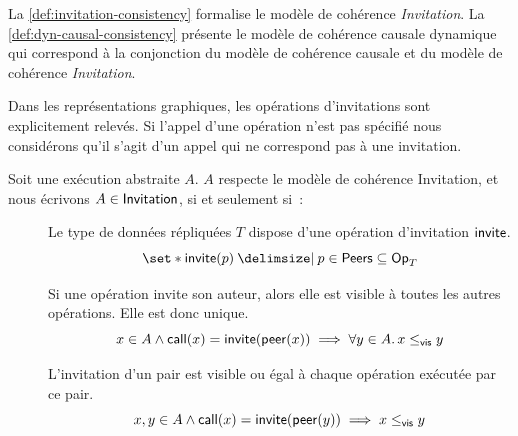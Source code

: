 La \autoref{def:invitation-consistency} formalise le modèle de cohérence \emph{Invitation}. La \autoref{def:dyn-causal-consistency} présente le modèle de cohérence causale dynamique qui correspond à la conjonction du modèle de cohérence causale et du modèle de cohérence \emph{Invitation}.

Dans les représentations graphiques, les opérations d'invitations sont explicitement relevés.
Si l'appel d'une opération n'est pas spécifié nous considérons qu'il s'agit d'un appel qui ne correspond pas à une invitation.

\begin{definition}[Invitation]\label{def:invitation-consistency}
Soit une exécution abstraite $A$. $A$ respecte le modèle de cohérence Invitation, et nous écrivons $A \in \operatorname{\mathsf{Invitation}}$, si et seulement si~:
\begin{description}
  \item[]
  Le type de données répliquées $T$ dispose d'une opération d'invitation $\operatorname{\mathsf{invite}}$.
  \begin{equation*}
  \set*{\trm{invite}(p) \given p \in \trm{Peers}} \subseteq \trm{Op}_T
  \end{equation*}

  \item[]
  Si une opération invite son auteur, alors elle est visible à toutes les autres opérations.
  Elle est donc unique.
  \begin{equation*}
      x \in A \land \operatorname{\mathsf{call}}(x) = \operatorname{\mathsf{invite}}(\operatorname{\mathsf{peer}}(x)) \implies \forall y \in A \ldotp x \leq_{\operatorname{\mathsf{vis}}} y 
  \end{equation*}

  \item[]
  L'invitation d'un pair est visible ou égal à chaque opération exécutée par ce pair.
  \begin{equation*}
      x, y \in A \land \operatorname{\mathsf{call}}(x) = \operatorname{\mathsf{invite}}(\operatorname{\mathsf{peer}}(y)) \implies x \leq_{\operatorname{\mathsf{vis}}} y
  \end{equation*}


\end{description}
\end{definition}
